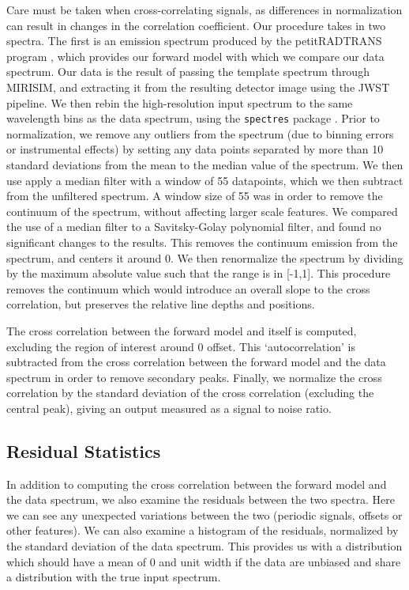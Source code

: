Care must be taken when cross-correlating signals, as differences in normalization can result in changes in the correlation coefficient. 
Our procedure takes in two spectra. 
The first is an emission spectrum produced by the petitRADTRANS program \parencite{Molliere2019}, which provides our forward model with which we compare our data spectrum.
Our data is the result of passing the template spectrum through MIRISIM, and extracting it from the resulting detector image using the JWST pipeline.
We then rebin the high-resolution input spectrum to the same wavelength bins as the data spectrum, using the \verb|spectres| package \parencite{Carnall2017}.
Prior to normalization, we remove any outliers from the spectrum (due to binning errors or instrumental effects) by setting any data points separated by more than 10 standard deviations from the mean to the median value of the spectrum.
We then use apply a median filter with a window of 55 datapoints, which we then subtract from the unfiltered spectrum. 
A window size of 55 was in order to remove the continuum of the spectrum, without affecting larger scale features.
We compared the use of a median filter to a Savitsky-Golay polynomial filter, and found no significant changes to the results.
This removes the continuum emission from the spectrum, and centers it around 0.
We then renormalize the spectrum by dividing by the maximum absolute value such that the range is in [-1,1]. 
This procedure removes the continuum which would introduce an overall slope to the cross correlation, but preserves the relative line depths and positions.

The cross correlation between the forward model and itself is computed, excluding the region of interest around 0 offset. 
This `autocorrelation' is subtracted from the cross correlation between the forward model and the data spectrum in order to remove secondary peaks.
Finally, we normalize the cross correlation by the standard deviation of the cross correlation (excluding the central peak), giving an output measured as a signal to noise ratio.

\subsection{Residual Statistics}
In addition to computing the cross correlation between the forward model and the data spectrum, we also examine the residuals between the two spectra.
Here we can see any unexpected variations between the two (periodic signals, offsets or other features).
We can also examine a histogram of the residuals, normalized by the standard deviation of the data spectrum.
This provides us with a  distribution which should have a mean of 0 and unit width if the data are unbiased and share a distribution with the true input spectrum.

